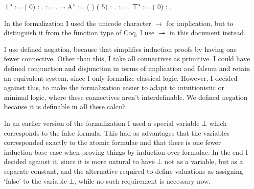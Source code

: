 \documentclass{article}
\newenvironment{code}%
 {\small\begin{list}{}%
         {\setlength{\leftmargin}{10mm}}%
         \item[]%
 }
 {\end{list}}
\begin{document}
\begin{code}
\coqdocnoindent
{} ⊥" :=  (  0)  : .\coqdoceol
\coqdocnoindent
{}   :=   .\coqdoceol
\coqdocnoindent
{} ¬ A" := ( ) (  5) : .\coqdoceol
\coqdocnoindent
{}  := .\coqdoceol
\coqdocnoindent
{} ⊤" :=  (  0) : .\coqdoceol
\end{code}
In the formalization I used the unicode character $\rightarrow$ for implication, but to distinguish it from the function type of Coq, I use $\rightharpoonup$ in this document instead.

I use defined negation, because that simplifies induction proofs by having one fewer connective. Other than this, I take all connectives as primitive. I could have defined conjunction and disjunction in terms of implication and falsum and retain an equivalent system, since I only formalize classical logic. However, I decided against this, to make the formalization easier to adapt to intuitionistic or minimal logic, where these connectives aren't interdefinable. We defined negation because it is definable in all these calculi.

In an earlier version of the formalization I used a special variable $\bot$ which corresponds to the false formula. This had as advantages that the variables corresponded exactly to the atomic formulae and that there is one fewer induction base case when proving things by induction over formulae. In the end I decided against it, since it is more natural to have $\bot$ not as a variable, but as a separate constant, and the alternative required to define valuations as assigning `false' to the variable $\bot$, while no such requirement is necessary now.
\end{document}
